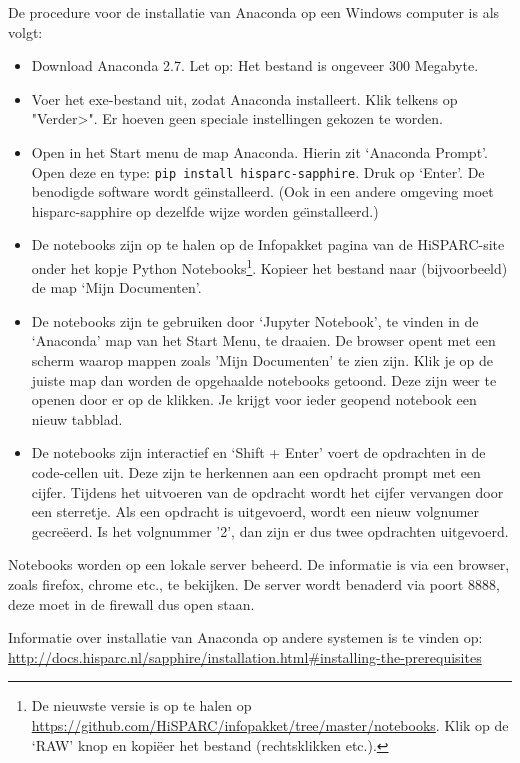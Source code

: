 De procedure voor de installatie van Anaconda op een Windows computer is als volgt:
\begin{itemize}
\item Download Anaconda 2.7. Let op: Het bestand is ongeveer 300 Megabyte.
\item Voer het exe-bestand uit, zodat Anaconda installeert. Klik telkens op "Verder>". Er hoeven geen speciale
    instellingen gekozen te worden.
\item Open in het Start menu de map Anaconda. Hierin zit `Anaconda Prompt'. Open deze en type:
 {\tt pip install hisparc-sapphire}. Druk op `Enter'. De benodigde \hisparc software wordt ge\"\i nstalleerd.
 (Ook in een andere \python omgeving moet hisparc-sapphire op dezelfde wijze worden ge\"\i nstalleerd.)
\item De notebooks zijn op te halen op de Infopakket pagina 
van de HiSPARC-site onder het kopje Python Notebooks\footnote{De nieuwste versie is op te halen op 
\url{https://github.com/HiSPARC/infopakket/tree/master/notebooks}. Klik op de `RAW' knop en kopi\"{e}er het bestand 
(rechtsklikken etc.).}. Kopieer het bestand naar (bijvoorbeeld) de map `Mijn Documenten'. 
\item De notebooks zijn te gebruiken door `Jupyter Notebook', te vinden in de `Anaconda' map van het Start Menu, te draaien. De browser
opent met een scherm waarop mappen zoals 'Mijn Documenten' te zien zijn. Klik je op de juiste map dan worden de opgehaalde notebooks
getoond. Deze zijn weer te openen door er op de klikken. Je krijgt voor ieder geopend notebook een nieuw tabblad.
\item De notebooks zijn interactief en `Shift + Enter' voert de opdrachten in de code-cellen uit. Deze zijn te herkennen aan
een opdracht prompt met een cijfer. Tijdens het uitvoeren van de opdracht wordt het cijfer vervangen door een sterretje. Als 
een opdracht is uitgevoerd, wordt een nieuw volgnumer gecre\"{e}erd. Is het volgnummer '2', dan zijn er dus twee opdrachten 
uitgevoerd.
\end{itemize}

Notebooks worden op een lokale server beheerd. De informatie is via een browser, zoals firefox, chrome etc., te bekijken. 
De server wordt benaderd via poort 8888, deze moet in de firewall dus open staan.

Informatie over installatie van Anaconda op andere systemen is te vinden op: \url{http://docs.hisparc.nl/sapphire/installation.html#installing-the-prerequisites} 



